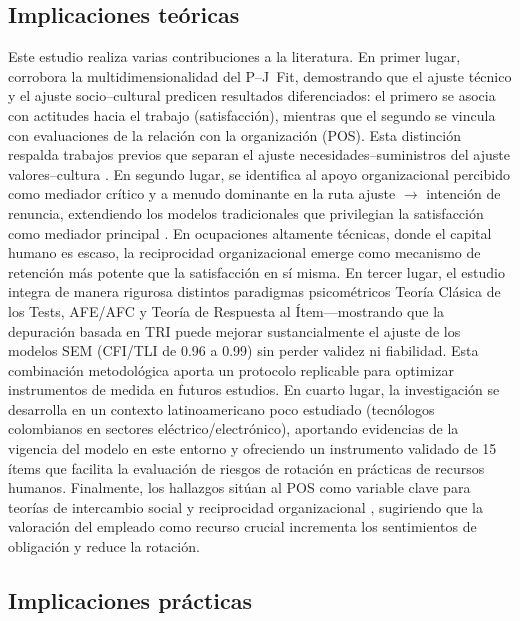 \subsection{Implicaciones teóricas}

Este estudio realiza varias contribuciones a la literatura. En primer lugar, corrobora la multidimensionalidad del P–J Fit, demostrando que el ajuste técnico y el ajuste socio–cultural predicen resultados diferenciados: el primero se asocia con actitudes hacia el trabajo (satisfacción), mientras que el segundo se vincula con evaluaciones de la relación con la organización (POS). Esta distinción respalda trabajos previos que separan el ajuste necesidades–suministros del ajuste valores–cultura \cite{lauver_distinguishing_2001,Cable2002}. En segundo lugar, se identifica al apoyo organizacional percibido como mediador crítico y a menudo dominante en la ruta ajuste $\rightarrow$ intención de renuncia, extendiendo los modelos tradicionales que privilegian la satisfacción como mediador principal \cite{tett_job_1993,griffeth_meta_2000}. En ocupaciones altamente técnicas, donde el capital humano es escaso, la reciprocidad organizacional emerge como mecanismo de retención más potente que la satisfacción en sí misma. En tercer lugar, el estudio integra de manera rigurosa distintos paradigmas psicométricos Teoría Clásica de los Tests, AFE/AFC y Teoría de Respuesta al Ítem—mostrando que la depuración basada en TRI puede mejorar sustancialmente el ajuste de los modelos SEM (CFI/TLI de 0.96 a 0.99) sin perder validez ni fiabilidad. Esta combinación metodológica aporta un protocolo replicable para optimizar instrumentos de medida en futuros estudios. En cuarto lugar, la investigación se desarrolla en un contexto latinoamericano poco estudiado (tecnólogos colombianos en sectores eléctrico/electrónico), aportando evidencias de la vigencia del modelo en este entorno y ofreciendo un instrumento validado de 15 ítems que facilita la evaluación de riesgos de rotación en prácticas de recursos humanos. Finalmente, los hallazgos sitúan al POS como variable clave para teorías de intercambio social y reciprocidad organizacional \cite{eisenberger_perceived_1986,rhoades_perceived_2002}, sugiriendo que la valoración del empleado como recurso crucial incrementa los sentimientos de obligación y reduce la rotación.

\subsection{Implicaciones prácticas}

